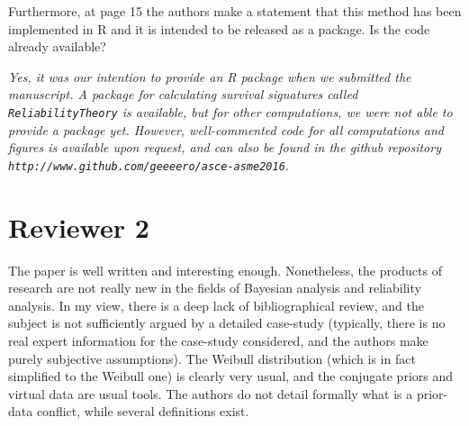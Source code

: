 \documentclass[Journal,SectionNumbers,SingleSpace,InsideFigs]{ascelike}
\begin{document}
Furthermore, at page 15 the authors make a statement that this method has been implemented in R
and it is intended to be released as a package. Is the code already available? 

\smallskip

\emph{Yes, it was our intention to provide an \textsf{R} package when we submitted the manuscript.
A package for calculating survival signatures called \texttt{ReliabilityTheory} is available,
but for other computations, we were not able to provide a package yet. %
However, well-commented code for all computations and figures is available upon request,
and can also be found in the github repository
\texttt{http://www.github.com/geeeero/asce-asme2016}.}


\section*{Reviewer 2}

The paper is well written and interesting enough.
Nonetheless, the products of research are not really new in the fields of Bayesian analysis and reliability analysis.
In my view, there is a deep lack of bibliographical review,
and the subject is not sufficiently argued by a detailed case-study
(typically, there is no real expert information for the case-study considered, and the authors make purely subjective assumptions).
The Weibull distribution (which is in fact simplified to the Weibull one) is clearly very usual,
and the conjugate priors and virtual data are usual tools.
The authors do not detail formally what is a prior-data conflict, while several definitions exist.

\smallskip
\end{document}
